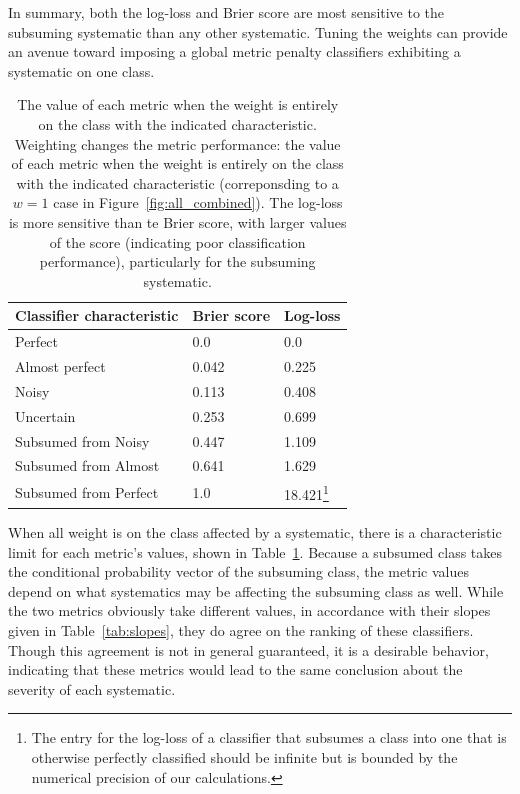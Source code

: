 In summary, both the log-loss and Brier score are most sensitive to the subsuming systematic than any other systematic.
Tuning the weights can provide an avenue toward imposing a global metric penalty classifiers exhibiting a systematic on one class.

\begin{table}[]
\begin{tabular}{lll}
Classifier characteristic & Brier score & Log-loss\\
\hline
Perfect & 0.0 & 0.0\\
Almost perfect & 0.042 & 0.225\\
Noisy & 0.113 & 0.408\\
Uncertain & 0.253 & 0.699\\
Subsumed from Noisy & 0.447 & 1.109\\
Subsumed from Almost & 0.641 & 1.629\\
Subsumed from Perfect & 1.0 & 18.421\footnote{The entry for the log-loss of a classifier that subsumes a class into one that is otherwise perfectly classified should be infinite but is bounded by the numerical precision of our calculations.}
\end{tabular}
\caption{
The value of each metric when the weight is entirely on the class with the indicated characteristic.
Weighting changes the metric performance: the value of each metric when the weight is entirely on the class with the indicated characteristic (correponsding to a $w=1$ case in Figure~\ref{fig:all_combined}).
The log-loss is more sensitive than te Brier score, with larger values of the score (indicating poor classification performance), particularly for the subsuming systematic.
}
\label{tab:extents}
\end{table}

When all weight is on the class affected by a systematic, there is a characteristic limit for each metric's values, shown in Table~\ref{tab:extents}.
Because a subsumed class takes the conditional probability vector of the subsuming class, the metric values depend on what systematics may be affecting the subsuming class as well.
While the two metrics obviously take different values, in accordance with their slopes given in Table~\ref{tab:slopes}, they do agree on the ranking of these classifiers.
Though this agreement is not in general guaranteed, it is a desirable behavior, indicating that these metrics would lead to the same conclusion about the severity of each systematic.


